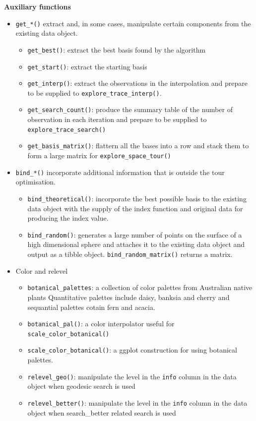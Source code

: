 \documentclass[12pt]{article}
\providecommand{\tightlist}{%
  \setlength{\itemsep}{0pt}\setlength{\parskip}{0pt}}
\begin{document}
\textbf{Auxiliary functions}

\begin{itemize}
\item
  \texttt{get\_*()} extract and, in some cases, manipulate certain components from the existing data object.

  \begin{itemize}
  \tightlist
  \item
    \texttt{get\_best()}: extract the best basis found by the algorithm
  \item
    \texttt{get\_start()}: extract the starting basis
  \item
    \texttt{get\_interp()}: extract the observations in the interpolation and prepare to be supplied to \texttt{explore\_trace\_interp()}.
  \item
    \texttt{get\_search\_count()}: produce the summary table of the number of observation in each iteration and prepare to be supplied to \texttt{explore\_trace\_search()}
  \item
    \texttt{get\_basis\_matrix()}: flattern all the bases into a row and stack them to form a large matrix for \texttt{explore\_space\_tour()}
  \end{itemize}
\item
  \texttt{bind\_*()} incorporate additional information that is outside the tour optimisation.

  \begin{itemize}
  \tightlist
  \item
    \texttt{bind\_theoretical()}: incorporate the best possible basis to the existing data object with the supply of the index function and original data for producing the index value.
  \item
    \texttt{bind\_random()}: generates a large number of points on the surface of a high dimensional sphere and attaches it to the existing data object and output as a tibble object. \texttt{bind\_random\_matrix()} returns a matrix.
  \end{itemize}
\item
  Color and relevel

  \begin{itemize}
  \tightlist
  \item
    \texttt{botanical\_palettes}: a collection of color palettes from Australian native plants Quantitative palettes include daisy, banksia and cherry and sequantial palettes cotain fern and acacia.
  \item
    \texttt{botanical\_pal()}: a color interpolator useful for \texttt{scale\_color\_botanical()}
  \item
    \texttt{scale\_color\_botanical()}: a ggplot construction for using botanical palettes.
  \item
    \texttt{relevel\_geo()}: manipulate the level in the \texttt{info} column in the data object when geodesic search is used
  \item
    \texttt{relevel\_better()}: manipulate the level in the \texttt{info} column in the data object when search\_better related search is used
  \end{itemize}
\end{itemize}
\end{document}

